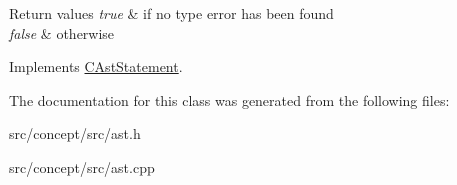 \begin{DoxyRetVals}{Return values}
{\em true} & if no type error has been found \\
\hline
{\em false} & otherwise \\
\hline
\end{DoxyRetVals}


Implements \hyperlink{classCAstStatement_af4e22fa71fa3b1fe73bb361a0fc4ec8b}{C\-Ast\-Statement}.



The documentation for this class was generated from the following files\-:\begin{DoxyCompactItemize}
\item 
src/concept/src/ast.\-h\item 
src/concept/src/ast.\-cpp\end{DoxyCompactItemize}
